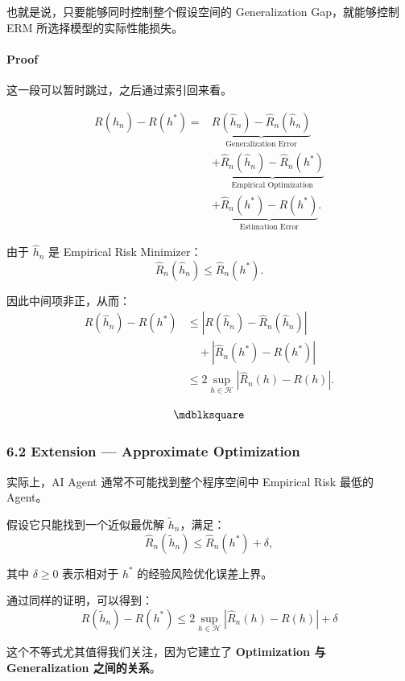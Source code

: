 也就是说，只要能够同时控制整个假设空间的 Generalization Gap，就能够控制 ERM 所选择模型的实际性能损失。

\hypertarget{part-2-12-0001-proof}{%
\paragraph{Proof}\label{part-2-12-0001-proof}}

这一段可以暂时跳过，之后通过索引回来看。

\[\begin{aligned}
R(\hat h_n)-R(h^*)
={}&
\underbrace{
R(\hat h_n)-\widehat R_n(\hat h_n)
}_{\text{Generalization Error}}
\\
&+
\underbrace{
\widehat R_n(\hat h_n)-\widehat R_n(h^*)
}_{\text{Empirical Optimization}}
\\
&+
\underbrace{
\widehat R_n(h^*)-R(h^*)
}_{\text{Estimation Error}}.
\end{aligned}\]

由于 \(\hat h_n\) 是 Empirical Risk Minimizer：
\[\widehat R_n(\hat h_n)
\leq
\widehat R_n(h^*).\]

因此中间项非正，从而：
\[\begin{aligned}
R(\hat h_n)-R(h^*)
&\leq
|R(\hat h_n)-\widehat R_n(\hat h_n)|\\
&\quad+
|\widehat R_n(h^*)-R(h^*)|\\
&\leq
2\sup_{h\in\mathcal H}
|\widehat R_n(h)-R(h)|.
\end{aligned}\]

\[\hfill\blacksquare\]

\hypertarget{part-2-12-0001-extension-approximate-optimization}{%
\subsubsection{6.2 Extension --- Approximate Optimization}\label{part-2-12-0001-extension-approximate-optimization}}

实际上，AI Agent 通常不可能找到整个程序空间中 Empirical Risk 最低的 Agent。

假设它只能找到一个近似最优解 \(\tilde h_n\)，满足：
\[\widehat R_n(\tilde h_n)
\leq
\widehat R_n(h^*)+\delta,\]

其中 \(\delta\geq0\) 表示相对于 \(h^*\) 的经验风险优化误差上界。

通过同样的证明，可以得到：
\[\boxed{
R(\tilde h_n)-R(h^*)
\leq
2\sup_{h\in\mathcal H}
|\widehat R_n(h)-R(h)|+\delta
}\]

这个不等式尤其值得我们关注，因为它建立了 \textbf{Optimization 与 Generalization 之间的关系}。


